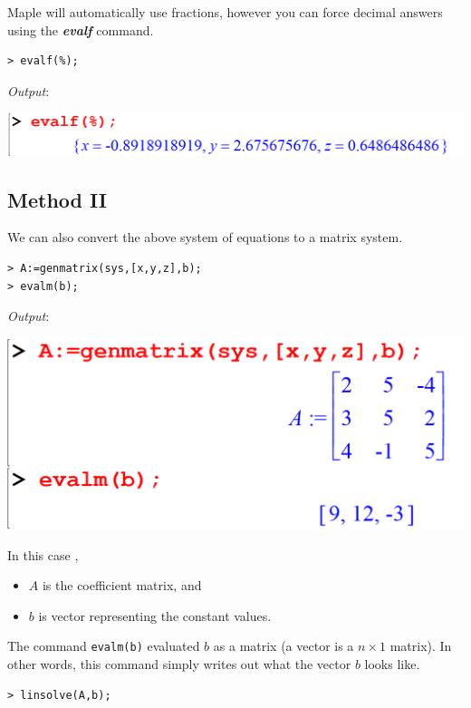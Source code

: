 \documentclass[
]{book}
\providecommand{\tightlist}{%
  \setlength{\itemsep}{0pt}\setlength{\parskip}{0pt}}
\theoremstyle{definition}
\theoremstyle{definition}
\theoremstyle{definition}
\theoremstyle{definition}
\theoremstyle{remark}
\begin{document}
Maple will automatically use fractions, however you can force decimal answers using the \textbf{\emph{evalf}} command.

\begin{verbatim}
> evalf(%);
\end{verbatim}

\emph{Output}:

\includegraphics{figures/Lessson 5/fig5.png}

\subsection{Method II}\label{method-ii}

We can also convert the above system of equations to a matrix system.

\begin{verbatim}
> A:=genmatrix(sys,[x,y,z],b);
> evalm(b);
\end{verbatim}

\emph{Output}:

\includegraphics{figures/Lessson 5/fig6.png}

In this case ,

\begin{itemize}
\tightlist
\item
  \(A\) is the coefficient matrix, and
\item
  \(b\) is vector representing the constant values.
\end{itemize}

The command \texttt{evalm(b)} evaluated \(b\) as a matrix (a vector is a \(n \times 1\) matrix).
In other words, this command simply writes out what the vector \(b\) looks like.

\begin{verbatim}
> linsolve(A,b);
\end{verbatim}
\end{document}
